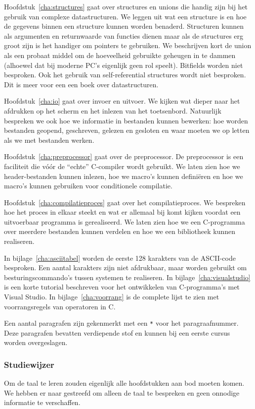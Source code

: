 Hoofdstuk~\ref{cha:structures} gaat over structures en unions die handig zijn bij het gebruik van complexe datastructuren. We leggen uit wat een structure is en hoe de gegevens binnen een structure kunnen worden benaderd. Structuren kunnen als argumenten en returnwaarde van functies dienen maar als de structures erg groot zijn is het handiger om pointers te gebruiken. We beschrijven kort de union als een probaat middel om de hoeveelheid gebruikte geheugen in te dammen (alhoewel dat bij moderne PC's eigenlijk geen rol speelt). Bitfields worden niet besproken. Ook het gebruik van self-referential structures wordt niet besproken. Dit is meer voor een een boek over datastructuren.

Hoofdstuk~\ref{cha:io} gaat over invoer en uitvoer. We kijken wat dieper naar het afdrukken op het scherm en het inlezen van het toetsenbord. Natuurlijk bespreken we ook hoe we informatie in bestanden kunnen bewerken: hoe worden bestanden geopend, geschreven, gelezen en gesloten en waar moeten we op letten als we met bestanden werken.

Hoofdstuk~\ref{cha:preprocessor} gaat over de preprocessor. De preprocessor is een faciliteit die vóór de ``echte'' C-compiler wordt gebruikt. We laten zien hoe we header-bestanden kunnen inlezen, hoe we macro's kunnen definiëren en hoe we macro's kunnen gebruiken voor conditionele compilatie.

Hoofdstuk~\ref{cha:compilatieproces} gaat over het compilatieproces. We bespreken hoe het proces in elkaar steekt en wat er allemaal bij komt kijken voordat een uitvoerbaar programma is gerealiseerd. We laten zien hoe we een C-programma over meerdere bestanden kunnen verdelen en hoe we een bibliotheek kunnen realiseren.

In bijlage~\ref{cha:asciitabel} worden de eerste 128 karakters van de ASCII-code besproken. Een aantal karakters zijn niet afdrukbaar, maar worden gebruikt om besturingscommando's tussen systemen te realiseren. In bijlage~\ref{cha:visualstudio} is een korte tutorial beschreven voor het ontwikkelen van C-programma's met Visual Studio. In bijlage~\ref{cha:voorrang} is de complete lijst te zien met voorrangsregels van operatoren in C.

Een aantal paragrafen zijn gekenmerkt met een \texttt{*} voor het paragraafnummer. Deze paragrafen bevatten verdiepende stof en kunnen bij een eerste cursus worden overgeslagen.

\subsubsection*{Studiewijzer}
Om de taal te leren zouden eigenlijk alle hoofdstukken aan bod moeten komen. We hebben er naar gestreefd om alleen de taal te bespreken en geen onnodige informatie te verschaffen. 

